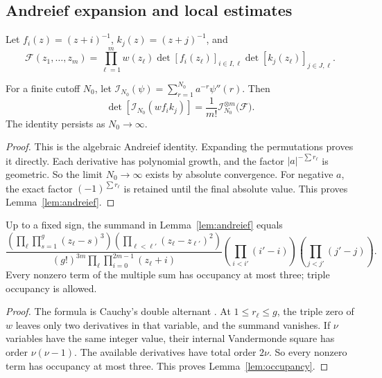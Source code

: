 \subsection{Andreief expansion and local estimates}\label{subsec:analytic-details}

Let \(f_i(z)=(z+i)^{-1}\), \(k_j(z)=(z+j)^{-1}\), and
\[
 \mathcal F(z_1,\ldots,z_m)=
 \prod_{\ell=1}^m w(z_\ell)
 \det[f_i(z_\ell)]_{i\in I,\ell}
 \det[k_j(z_\ell)]_{j\in J,\ell}.
\]

\begin{lemma}\label{lem:andreief}
For a finite cutoff \(N_0\), let \(\mathcal I_{N_0}(\psi)=\sum_{r=1}^{N_0} a^{-r}\psi''(r)\). Then
\[
 \det[\mathcal I_{N_0}(w f_i k_j)]
 =\frac{1}{m!}\mathcal I_{N_0}^{\otimes m}
 \bigl(\mathcal F\bigr).
\]
The identity persists as \(N_0\to\infty\).
\end{lemma}

\begin{proof}
This is the algebraic Andreief identity. Expanding the permutations proves it directly. Each derivative has polynomial growth, and the factor \(|a|^{-\sum r_\ell}\) is geometric. So the limit \(N_0\to\infty\) exists by absolute convergence. For negative \(a\), the exact factor \((-1)^{\sum r_\ell}\) is retained until the final absolute value. This proves Lemma~\ref{lem:andreief}.
\end{proof}

\begin{lemma}\label{lem:occupancy}
Up to a fixed sign, the summand in Lemma~\ref{lem:andreief} equals
\begin{equation}\label{eq:cauchy-form}
 \frac{\left(\prod_\ell\prod_{s=1}^g(z_\ell-s)^3\right)
   \left(\prod_{\ell<\ell'}(z_\ell-z_{\ell'})^2\right)}
  {(g!)^{3m}\prod_\ell\prod_{i=0}^{2m-1}(z_\ell+i)}
 \left(\prod_{i<i'}(i'-i)\right)
 \left(\prod_{j<j'}(j'-j)\right) .
\end{equation}
Every nonzero term of the multiple sum has occupancy at most three; triple occupancy is allowed.
\end{lemma}

\begin{proof}
The formula is Cauchy's double alternant \cite[(2.7)]{Krattenthaler}. At \(1\le r_\ell\le g\), the triple zero of \(w\) leaves only two derivatives in that variable, and the summand vanishes. If \(\nu\) variables have the same integer value, their internal Vandermonde square has order \(\nu(\nu-1)\). The available derivatives have total order \(2\nu\). So every nonzero term has occupancy at most three. This proves Lemma~\ref{lem:occupancy}.
\end{proof}

